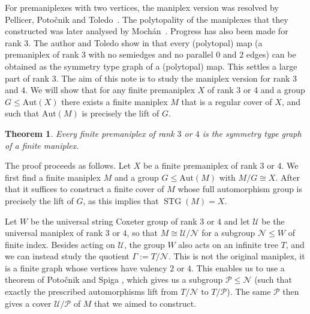 \documentclass{amsart}
\theoremstyle{plain}
\newtheorem{theorem}{Theorem}[section]
\theoremstyle{definition}
\theoremstyle{remark}
\newcommand{\U}{\mathcal U}
\renewcommand{\P}{\mathcal P}
\newcommand{\N}{\mathcal N}
\newcommand{\Aut}{\mathrm{Aut}}
\DeclareMathOperator{\STG}{STG}
\newcommand{\stg}{\STG}
\begin{document}
For premaniplexes with two vertices, the maniplex version was resolved by Pellicer,
Poto\v{c}nik and Toledo~\cite{PellicerPotocnikToledo2019}.
The polytopality of the maniplexes that they constructed was later analysed by
Moch\'{a}n~\cite{Mochan2024}. 
Progress has also been made for rank $3$. The author and Toledo show 
in \cite{LekseToledo} that every (polytopal) map 
(a premaniplex of rank $3$ with no semiedges and no parallel $0$ and $2$ edges)
can be obtained as the symmetry type graph of a (polytopal) map. This settles a large part of 
rank $3$.
The aim of this note is to study the maniplex version for rank $3$ and $4$.
We will show that for any finite premaniplex $X$ of rank $3$ or $4$ and a group $G\le \Aut(X)$ there
exists a finite maniplex $M$ that is a regular cover of $X$, and such that 
$\Aut(M)$ is precisely the lift of $G$.

\begin{theorem}\label{th:main}
	Every finite premaniplex of rank $3$ or $4$ is the symmetry type graph of a finite maniplex.
\end{theorem}



The proof proceeds as follows. 
Let $X$ be a finite premaniplex of rank $3$ or $4$. 
We first find a finite maniplex $M$ and a group $G\le\Aut(M)$ with 
$M / G \cong X$. After that it
suffices to construct a finite cover of $M$ whose full automorphism group is precisely
the lift of $G$, as this implies that $\stg(M) = X$.

Let $W$ be the universal string Coxeter group of rank $3$ or $4$ and let $\U$ be the universal
maniplex of rank $3$ or $4$, so that $M \cong \U/ \N$ for a subgroup $\N\le W$ of
finite index. Besides
acting on $\U$, the group $W$ also acts on an infinite tree $T$, and we
can instead study the quotient $\Gamma:=T / \N$. 
This is not the original maniplex,
it is a finite graph whose vertices have valency $2$
or $4$. This enables us to use a theorem of Potočnik and 
Spiga \cite{PotocnikSpiga2019}, which
gives us a subgroup $\P\le\N$ (such that exactly the prescribed
automorphisms lift from $T/\N$ to $T/ \P$). The same $\P$ then gives a
cover $\U/\P$ of $M$ that we aimed to construct.
\end{document}
